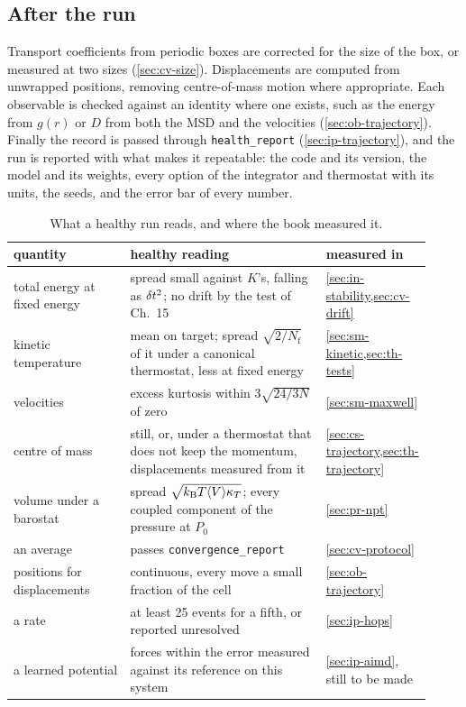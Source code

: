 \subsection*{After the run}

Transport coefficients from periodic boxes are corrected for the size of
the box, or measured at two sizes (\cref{sec:cv-size}). Displacements
are computed from unwrapped positions, removing centre-of-mass motion
where appropriate. Each observable is checked against an identity where one exists, such
as the energy from $g(r)$ or $D$ from both the MSD and the velocities
(\cref{sec:ob-trajectory}). Finally the record is passed through
\texttt{health\_report} (\cref{sec:ip-trajectory}), and the run is
reported with what makes it repeatable: the code and its version, the
model and its weights, every option of the integrator and thermostat with
its units, the seeds, and the error bar of every number.

\begin{table}[htb]
\centering
\small
\caption{What a healthy run reads, and where the book measured it.}
\label{tab:ip-healthy}
\begin{tabular}{@{}>{\raggedright\arraybackslash}p{0.29\linewidth}
   >{\raggedright\arraybackslash}p{0.47\linewidth}
   >{\raggedright\arraybackslash}p{0.16\linewidth}@{}}
\toprule
quantity & healthy reading & measured in\\
\midrule
total energy at fixed energy & spread small against $K$'s, falling as
$\delta t^2$; no drift by the test of Ch.~15 & \cref{sec:in-stability,sec:cv-drift}\\
kinetic temperature & mean on target; spread $\sqrt{2/N_{\mathrm f}}$ of
it under a canonical thermostat, less at fixed energy &
\cref{sec:sm-kinetic,sec:th-tests}\\
velocities & excess kurtosis within $3\sqrt{24/3N}$ of zero &
\cref{sec:sm-maxwell}\\
centre of mass & still, or, under a thermostat that does not keep the
momentum, displacements measured from it &
\cref{sec:cs-trajectory,sec:th-trajectory}\\
volume under a barostat & spread $\sqrt{k_{\mathrm{B}} T\langle V \rangle\kappa_T}$; every
coupled component of the pressure at $P_0$ & \cref{sec:pr-npt}\\
an average & passes \texttt{convergence\_report} & \cref{sec:cv-protocol}\\
positions for displacements & continuous, every move a small fraction of
the cell & \cref{sec:ob-trajectory}\\
a rate & at least 25 events for a fifth, or reported unresolved &
\cref{sec:ip-hops}\\
a learned potential & forces within the error measured against its
reference on this system & \cref{sec:ip-aimd}, still to be made\\
\bottomrule
\end{tabular}
\end{table}


